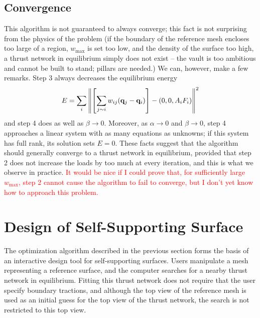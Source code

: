 \documentclass[annual]{acmsiggraph}
\newcommand{\todo}[1]{\textcolor{red}{#1}}
\begin{document}
\subsection{Convergence}
This algorithm is not guaranteed to always converge; this fact is not surprising from the physics of the problem (if the boundary of the reference mesh encloses too large of a region, $w_{\max}$ is set too low, and the density of the surface too high, a thrust network in equilibrium simply does not exist -- the vault is too ambitious and cannot be built to stand; pillars are needed.) We can, however, make a few remarks. Step 3 always decreases the equilibrium energy 
$$E=\sum_i \left\| \left[\sum_{j\sim i} w_{ij} ({\mathbf q}_j - {\mathbf q}_i)\right] - (0,0,A_i F_i) \right\|^2$$
and step 4 does as well as $\beta \to 0$. Moreover, as $\alpha \to 0$ and $\beta \to 0$, step 4 approaches a linear system with as many equations as unknowns; if this system has full rank, its solution sets $E=0$. These facts suggest that the algorithm should generally converge to a thrust network in equilibrium, provided that step 2 does not increase the loads by too much at every iteration, and this is what we observe in practice.  \todo{It would be nice if I could prove that, for sufficiently large $w_{\textrm{max}}$, step 2 cannot cause the algorithm to fail to converge, but I don't yet know how to approach this problem.}

\section{Design of Self-Supporting Surface} \label{sec:design}
The optimization algorithm described in the previous section forms the basis of an interactive design tool for self-supporting surfaces. Users manipulate a mesh representing a reference surface, and the computer searches for a nearby thrust network in equilibrium. Fitting this thrust network does not require that the user specify boundary tractions, and although the top view of the reference mesh is used as an initial guess for the top view of the thrust network, the search is not restricted to this top view.
\end{document}
